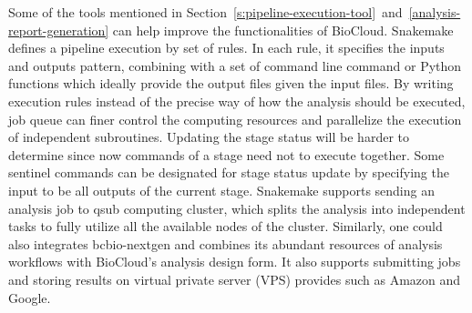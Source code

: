 Some of the tools mentioned in
Section~\ref{s:pipeline-execution-tool}~and~\ref{analysis-report-generation}
can help improve the functionalities of BioCloud. Snakemake
\cite{koster2012:snakemakea} defines a pipeline execution by set of rules. In
each rule, it specifies the inputs and outputs pattern, combining with a set of
command line command or Python functions which ideally provide the output files
given the input files. By writing execution rules instead of the precise way of
how the analysis should be executed, job queue can finer control the computing
resources and parallelize the execution of independent subroutines. Updating
the stage status will be harder to determine since now commands of a stage need
not to execute together. Some sentinel commands can be designated for stage
status update by specifying the input to be all outputs of the current stage.
Snakemake supports sending an analysis job to qsub computing cluster, which
splits the analysis into independent tasks to fully utilize all the available
nodes of the cluster. Similarly, one could also integrates bcbio-nextgen
\cite{:bcbionextgen,guimera2012:bcbionextgen} and combines its abundant
resources of analysis workflows with BioCloud's analysis design form. It also
supports submitting jobs and storing results on virtual private server (VPS)
provides such as Amazon and Google.

